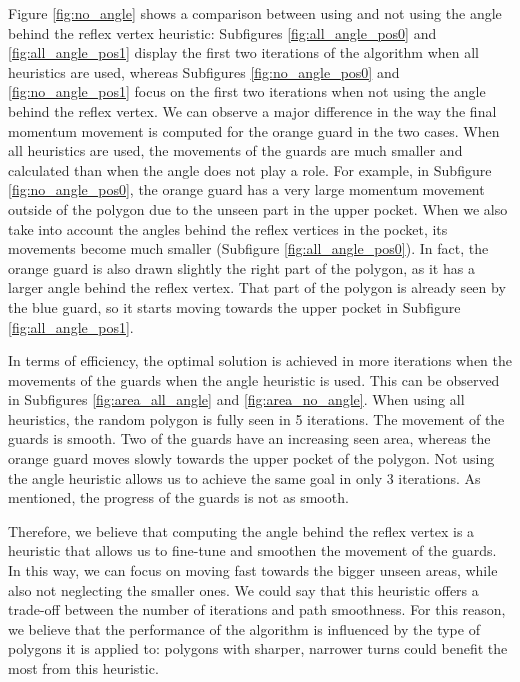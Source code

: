 Figure \ref{fig:no_angle} shows a comparison between using and not using the angle behind the reflex vertex heuristic: Subfigures \ref{fig:all_angle_pos0} and \ref{fig:all_angle_pos1} display the first two iterations of the algorithm when all heuristics are used, whereas  Subfigures \ref{fig:no_angle_pos0} and \ref{fig:no_angle_pos1} focus on the first two iterations when not using the angle behind the reflex vertex.
We can observe a major difference in the way the final momentum movement is computed for the orange guard in the two cases. When all heuristics are used, the movements of the guards are much smaller and calculated than when the angle does not play a role. For example, in Subfigure \ref{fig:no_angle_pos0}, the orange guard has a very large momentum movement outside of the polygon due to the unseen part in the upper pocket. When we also take into account the angles behind the reflex vertices in the pocket, its movements become much smaller (Subfigure \ref{fig:all_angle_pos0}). In fact, the orange guard is also drawn slightly the right part of the polygon, as it has a larger angle behind the reflex vertex. That part of the polygon is already seen by the blue guard, so it starts moving towards the upper pocket in Subfigure \ref{fig:all_angle_pos1}.

In terms of efficiency, the optimal solution is achieved in more iterations when the movements of the guards when the angle heuristic is used. This can be observed in Subfigures \ref{fig:area_all_angle} and \ref{fig:area_no_angle}. When using all heuristics, the random polygon is fully seen in 5 iterations. The movement of the guards is smooth. Two of the guards have an increasing seen area, whereas the orange guard moves slowly towards the upper pocket of the polygon. Not using the angle heuristic allows us to achieve the same goal in only 3 iterations. As mentioned, the progress of the guards is not as smooth.

Therefore, we believe that computing the angle behind the reflex vertex is a heuristic that allows us to fine-tune and smoothen the movement of the guards. In this way, we can focus on moving fast towards the bigger unseen areas, while also not neglecting the smaller ones. We could say that this heuristic offers a trade-off between the number of iterations and path smoothness. For this reason, we believe that the performance of the algorithm is influenced by the type of polygons it is applied to: polygons with sharper, narrower turns could benefit the most from this heuristic.

